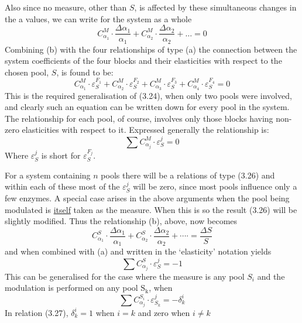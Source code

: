 Also since no measure, other than $S$, is affected by these simultaneous changes in the a values, we can write for the system as a whole
%
\begin{equation}
C_{\alpha_{1}}^{M} \cdot \frac{\Delta \alpha_{1}}{\alpha_{1}}+ C_{\alpha_{2}}^{M} \cdot \frac{\Delta \alpha_{2}}{\alpha_{2}} + \ldots =0 \tag{b}
\label{eqn:324b}
\end{equation}
%
Combining (b) with the four relationships of type (a) the connection between the system coefficients of the four blocks and their elasticities with respect to the chosen pool, $S$, is found to be:
%
\begin{equation}
C_{\alpha_{1}}^{M} \cdot \varepsilon_{S}^{F_{1}}+ C_{\alpha_{2}}^{M} \cdot \varepsilon_{S}^{F_{2}}+ C_{\alpha_{3}}^{M} \cdot \varepsilon_{S}^{F_{3}}+ C_{\alpha_{4}}^{M} \cdot \varepsilon_{S}^{F_{4}}=0
\label{eqn:325}
\end{equation}
%
This is the required generalisation of (3.24), when only two pools were involved, and clearly such an equation can be written down for every pool in the system. The relationship for each pool, of course, involves only those blocks having non-zero elasticities with respect to it. Expressed generally the relationship is:
%
\begin{equation}
\sum C_{\alpha_{j}}^{M} \cdot \varepsilon_{S}^{j}=0
\label{eqn:326}
\end{equation}
%
Where $\varepsilon_{S}^{j}$ is short for $\varepsilon_{S}^{F_j}$.

For a system containing $n$ pools there will be a relations of type (3.26) and within each of these most of the $\varepsilon_{S}^{j}$ will be zero, since most pools influence only a few enzymes. A special case arises in the above arguments when the pool being modulated is \underline{itself} taken as the measure. When this is so the result (3.26) will be slightly modified. Thus the relationship (b), above, now becomes
%
$$
C_{\alpha_{1}}^{S} \cdot \frac{\Delta \alpha_{1}}{\alpha_{1}} + C_{\alpha_{2}}^{S} \cdot \frac{\Delta \alpha_{2}}{\alpha_{2}} + \cdots \cdot=\frac{\Delta S}{S}
$$
%
and when combined with (a) and written in the `elasticity' notation yields
%
$$
\sum C_{\alpha_{j}}^{S} \cdot \varepsilon_{S}^{j} = -1
$$
%
This can be generalised for the case where the measure is any pool $S_{i}$ and the modulation is performed on any pool $\mathrm{S}_{\mathrm{k}}$, when
%
\begin{equation}
\sum C_{\alpha_{j}}^{S_{i}} \cdot \varepsilon_{S_{k}}^{j}=-\delta_{k}^{i}
\label{eqn:327}
\end{equation}
%
In relation (3.27), $\delta_{k}^{i}=1$ when $i=k$ and zero when $i \neq k$

